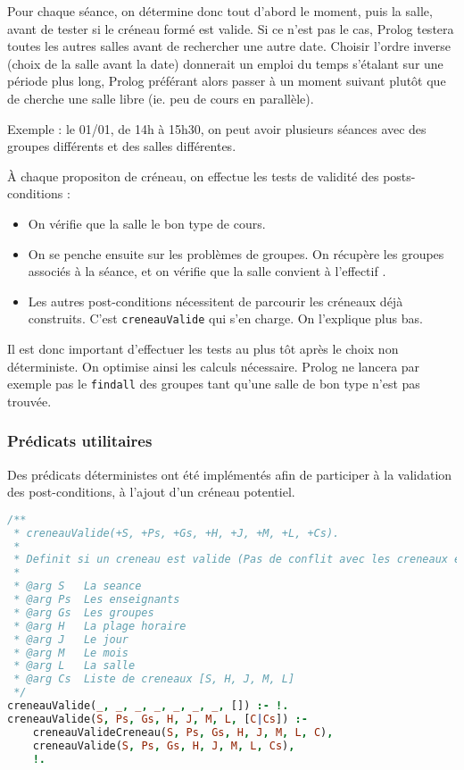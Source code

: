 Pour chaque séance, on détermine donc tout d'abord le moment, puis la salle,
avant de tester si le créneau formé est valide. Si ce n'est pas le cas, Prolog
testera toutes les autres salles avant de rechercher une autre date.
Choisir l'ordre inverse (choix de la salle avant la date) donnerait un emploi du
temps s'étalant sur une période plus long, Prolog préférant alors passer à un
moment suivant plutôt que de cherche une salle libre (ie. peu de cours en
parallèle).

Exemple : le 01/01, de 14h à 15h30, on peut avoir plusieurs séances avec des
groupes différents et des salles différentes.

À chaque propositon de créneau, on effectue les tests de validité des
posts-conditions :

\begin{itemize}

    \item On vérifie que la salle le bon type de cours.

    \item On se penche ensuite sur les problèmes de groupes. On récupère les
        groupes associés à la séance, et on vérifie que la salle convient à
        l'effectif .

    \item Les autres post-conditions nécessitent de parcourir les créneaux déjà
        construits. C'est \texttt{creneauValide} qui s'en charge. On l'explique
        plus bas.

\end{itemize}

Il est donc important d'effectuer les tests au plus tôt après le choix non
déterministe. On optimise ainsi les calculs nécessaire. Prolog ne lancera par
exemple pas le \texttt{findall} des groupes tant qu'une salle de bon type n'est
pas trouvée.

\subsubsection{Prédicats utilitaires}

Des prédicats déterministes ont été implémentés afin de participer à la
validation des post-conditions, à l'ajout d'un créneau potentiel.

\begin{lstlisting}[language=Prolog, caption=creneauValide, captionpos=b,
label={lst:creneauValide}]
/**
 * creneauValide(+S, +Ps, +Gs, +H, +J, +M, +L, +Cs).
 *
 * Definit si un creneau est valide (Pas de conflit avec les creneaux existants)
 *
 * @arg S   La seance
 * @arg Ps  Les enseignants
 * @arg Gs  Les groupes
 * @arg H   La plage horaire
 * @arg J   Le jour
 * @arg M   Le mois
 * @arg L   La salle
 * @arg Cs  Liste de creneaux [S, H, J, M, L]
 */
creneauValide(_, _, _, _, _, _, _, []) :- !.
creneauValide(S, Ps, Gs, H, J, M, L, [C|Cs]) :-
    creneauValideCreneau(S, Ps, Gs, H, J, M, L, C),
    creneauValide(S, Ps, Gs, H, J, M, L, Cs),
    !.
\end{lstlisting}

